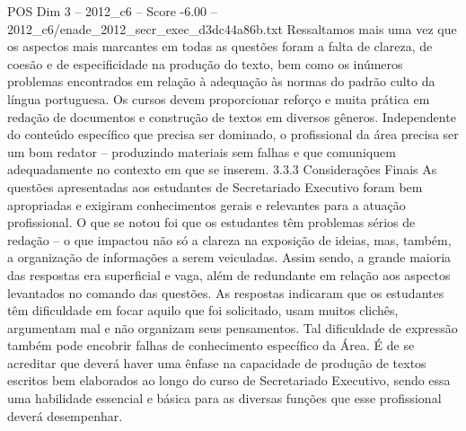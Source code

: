 \begin{textsample}{POS Dim 3 – 2012\_c6 – Score -6.00 – 2012\_c6/enade\_2012\_secr\_exec\_d3dc44a86b.txt}
Ressaltamos mais uma vez que os aspectos mais marcantes em todas as questões foram a falta de clareza, de coesão e de especificidade na produção do texto, bem como os inúmeros problemas encontrados em relação à adequação às normas do padrão culto da língua portuguesa.
Os cursos devem proporcionar reforço e muita prática em redação de documentos e construção de textos em diversos gêneros.
Independente do conteúdo específico que precisa ser dominado, o profissional da área precisa ser um bom redator – produzindo materiais sem falhas e que comuniquem adequadamente no contexto em que se inserem. 3.3.3 Considerações Finais As questões apresentadas aos estudantes de Secretariado Executivo foram bem apropriadas e exigiram conhecimentos gerais e relevantes para a atuação profissional.
O que se notou foi que os estudantes têm problemas sérios de redação – o que impactou não só a clareza na exposição de ideias, mas, também, a organização de informações a serem veiculadas.
Assim sendo, a grande maioria das respostas era superficial e vaga, além de redundante em relação aos aspectos levantados no comando das questões.
As respostas indicaram que os estudantes têm dificuldade em focar aquilo que foi solicitado, usam muitos clichês, argumentam mal e não organizam seus pensamentos.
Tal dificuldade de expressão também pode encobrir falhas de conhecimento específico da Área.
É de se acreditar que deverá haver uma ênfase na capacidade de produção de textos escritos bem elaborados ao longo do curso de Secretariado Executivo, sendo essa uma habilidade essencial e básica para as diversas funções que esse profissional deverá desempenhar.

\end{textsample}
